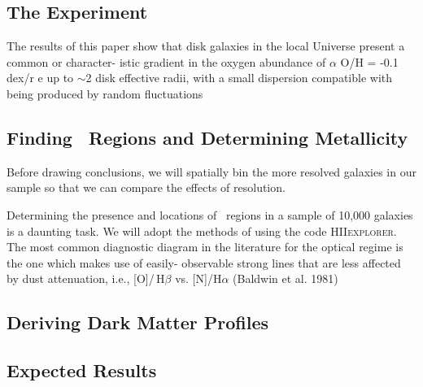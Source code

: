 \documentclass[11pt, a4paper, onecolumn]{article}
\begin{document}
\begin{multicols}{2}

\section{The Experiment}


    \citet{sanchez12} The results of this paper show that disk galaxies in the
    local Universe present a common or character- istic gradient in the oxygen
    abundance of $\alpha$ O/H = -0.1 dex/r e up to $\sim$2 disk effective radii,
    with a small dispersion compatible with being produced by random
    fluctuations


\subsection{Finding \hii\ Regions and Determining Metallicity}

    Before drawing conclusions, we will spatially bin the more resolved
    galaxies in our sample so that we can compare the effects of resolution.

    Determining the presence and locations of \hii\ regions in a sample of
    10,000 galaxies is a daunting task. We will adopt the methods of
    \citet{sanchez12} using the code \textsc{HIIexplorer}. The most common
    diagnostic diagram in the literature for the optical regime is the one
    which makes use of easily- observable strong lines that are less affected
    by dust attenuation, i.e., [O\iii]/\,H$\beta$ vs. [N\ii]/H$\alpha$
    (Baldwin et al. 1981)

\subsection{Deriving Dark Matter Profiles}



\subsection{Expected Results}


\end{multicols}
\end{document}
